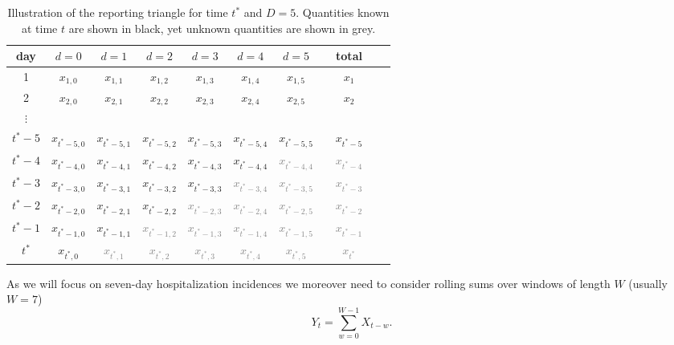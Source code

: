 \documentclass[a4paper, 11pt]{article}\usepackage[]{graphicx}\usepackage[]{color}
\begin{document}
\begin{table}[h!]
\caption{Illustration of the reporting triangle for time $t^*$ and $D = 5$. Quantities known at time $t$ are shown in black, yet unknown quantities are shown in grey.}
\label{tab:triangle}
\begin{center}
\begin{tabular}{c c c c c c c c c c c}
day & $d = 0$ & $d = 1$ & $d = 2$ & $d = 3$ & $d = 4$ & $d = 5$ & & total\\
\hline
1 & $x_{1, 0}$ & $x_{1, 1}$ & $x_{1, 2}$ & $x_{1, 3}$ & $x_{1, 4}$ & $x_{1, 5}$ & & $x_1$\\
2 & $x_{2, 0}$ & $x_{2, 1}$ & $x_{2, 2}$ & $x_{2, 3}$ & $x_{2, 4}$ & $x_{2, 5}$ & & $x_2$\\
$\vdots$\\
$t^* - 5$ & $x_{t^* - 5, 0}$ & $x_{t^* - 5, 1}$ & $x_{t^* - 5, 2}$ & $x_{t^* - 5, 3}$ & $x_{t^* - 5, 4}$ & $x_{t^* - 5, 5}$ & & $x_{t^* - 5}$\\
$t^* - 4$ & $x_{t^* - 4, 0}$ & $x_{t^* - 4, 1}$ & $x_{t^* - 4, 2}$ & $x_{t^* - 4, 3}$ & $x_{t^* - 4, 4}$ & \textcolor{gray}{$x_{t^* - 4, 4}$} & & \textcolor{gray}{$x_{t^* - 4}$}\\
$t^* - 3$ & $x_{t^* - 3, 0}$ & $x_{t^* - 3, 1}$ & $x_{t^* - 3, 2}$ & $x_{t^* - 3, 3}$ & \textcolor{gray}{$x_{t^* - 3, 4}$} & \textcolor{gray}{$x_{t^* - 3, 5}$} & & \textcolor{gray}{$x_{t^* - 3}$}\\
$t^* - 2$ & $x_{t^* - 2, 0}$ & $x_{t^* - 2, 1}$ & $x_{t^* - 2, 2}$ & \textcolor{gray}{$x_{t^* - 2, 3}$} & \textcolor{gray}{$x_{t^* - 2, 4}$} & \textcolor{gray}{$x_{t^* - 2, 5}$} & & \textcolor{gray}{$x_{t^* - 2}$}\\
$t^* - 1$ & $x_{t^* - 1, 0}$ & $x_{t^* - 1, 1}$ & \textcolor{gray}{$x_{t^* - 1, 2}$} & \textcolor{gray}{$x_{t^* - 1, 3}$} & \textcolor{gray}{$x_{t^* - 1, 4}$} & \textcolor{gray}{$x_{t^* - 1, 5}$} & & \textcolor{gray}{$x_{t^* - 1}$}\\
$t^*$ & $x_{t^*, 0}$ & \textcolor{gray}{$x_{t^*, 1}$} & \textcolor{gray}{$x_{t^*, 2}$} & \textcolor{gray}{$x_{t^*, 3}$} & \textcolor{gray}{$x_{t^*, 4}$} & \textcolor{gray}{$x_{t^*, 5}$} &  & \textcolor{gray}{$x_{t^*}$}\\
\end{tabular}
\end{center}
\end{table}
\noindent As we will focus on seven-day hospitalization incidences we moreover need to consider rolling sums over windows of length $W$ (usually $W = 7$)
$$
Y_t = \sum_{w = 0}^{W - 1} X_{t - w}.
$$
\end{document}
